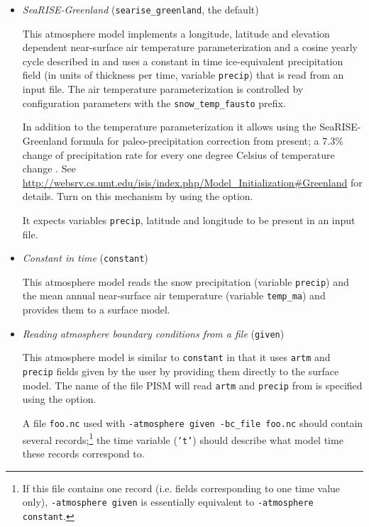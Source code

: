 \begin{itemize}
  \item \emph{SeaRISE-Greenland} (\texttt{searise_greenland}, the default)

    This atmosphere model implements a longitude, latitude and elevation dependent near-surface air temperature parameterization and a cosine yearly cycle described in \cite{Faustoetal2009} and uses a constant in time ice-equivalent precipitation field (in units of thickness per time, variable \texttt{precip}) that is read from an input file.  The air temperature parameterization is controlled by configuration parameters with the \texttt{snow_temp_fausto} prefix.

    In addition to the temperature parameterization it allows using the SeaRISE-Greenland formula for paleo-precipitation correction from present; a 7.3\% change of precipitation rate for every one degree Celsius of temperature change \cite{Huybrechts02}.  See \url{http://websrv.cs.umt.edu/isis/index.php/Model_Initialization#Greenland} for details.  Turn on this mechanism by using the  option.

    It expects variables \texttt{precip}, latitude and longitude to be present in an input file.

 \item \emph{Constant in time} (\texttt{constant})

    This atmosphere model reads the snow precipitation (variable \texttt{precip}) and the mean annual near-surface air temperature (variable \texttt{temp_ma}) and provides them to a surface model.

  \item \emph{Reading atmosphere boundary conditions from a file} (\texttt{given})

    This atmosphere model is similar to \texttt{constant} in that it uses \texttt{artm} and \texttt{precip} fields given by the user by providing them directly to the surface model. The name of the file PISM will read \texttt{artm} and \texttt{precip} from is specified using the  option.

    A file \texttt{foo.nc} used with \texttt{-atmosphere given -bc_file foo.nc} should contain several records;\footnote{If this file contains one record (i.e. fields corresponding to one time value only), \texttt{-atmosphere given} is essentially equivalent to \texttt{-atmosphere constant}.} the time variable (\texttt{'t'}) should describe what model time these records correspond to.


\end{itemize}
